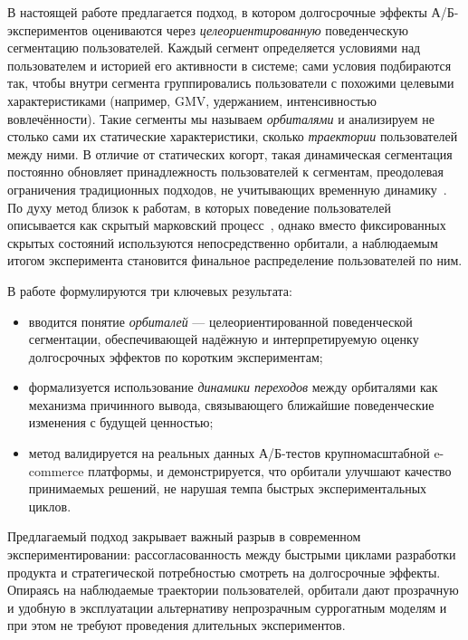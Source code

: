 В настоящей работе предлагается подход, в котором долгосрочные эффекты
А/Б-экспериментов оцениваются через \textit{целеориентированную} поведенческую
сегментацию пользователей. Каждый сегмент определяется условиями над
пользователем и историей его активности в системе; сами условия подбираются
так, чтобы внутри сегмента группировались пользователи с похожими целевыми
характеристиками (например, GMV, удержанием, интенсивностью вовлечённости).
Такие сегменты мы называем \textit{орбиталями} и анализируем не столько
сами их статические характеристики, сколько \textit{траектории} пользователей
между ними. В отличие от статических когорт, такая динамическая сегментация
постоянно обновляет принадлежность пользователей к сегментам, преодолевая
ограничения традиционных подходов, не учитывающих временную
динамику~\cite{REUTTERER200643,zhuzhel2021cohortney,orduz2023cohort}.
По духу метод близок к работам, в которых поведение пользователей описывается
как скрытый марковский процесс~\cite{netzer2008mm,pfeifer2003modeling}, однако
вместо фиксированных скрытых состояний используются непосредственно
орбитали, а наблюдаемым итогом эксперимента становится финальное распределение
пользователей по ним.

В работе формулируются три ключевых результата:
\begin{itemize}
  \item вводится понятие \textit{орбиталей} --- целеориентированной
        поведенческой сегментации, обеспечивающей надёжную и интерпретируемую
        оценку долгосрочных эффектов по коротким экспериментам;
  \item формализуется использование \textit{динамики переходов} между
        орбиталями как механизма причинного вывода, связывающего ближайшие
        поведенческие изменения с будущей ценностью;
  \item метод валидируется на реальных данных А/Б-тестов крупномасштабной
        e-commerce платформы, и демонстрируется, что орбитали улучшают
        качество принимаемых решений, не нарушая темпа быстрых
        экспериментальных циклов.
\end{itemize}

Предлагаемый подход закрывает важный разрыв в современном экспериментировании:
рассогласованность между быстрыми циклами разработки продукта и стратегической
потребностью смотреть на долгосрочные эффекты. Опираясь на наблюдаемые
траектории пользователей, орбитали дают прозрачную и удобную в эксплуатации
альтернативу непрозрачным суррогатным моделям и при этом не требуют
проведения длительных экспериментов.

